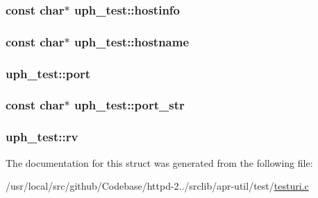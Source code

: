 \subsubsection[{\texorpdfstring{hostinfo}{hostinfo}}]{\setlength{\rightskip}{0pt plus 5cm}const char$\ast$ uph\+\_\+test\+::hostinfo}\hypertarget{structuph__test_ad9ed1e156d8a96df2b48b13f63d42803}{}\label{structuph__test_ad9ed1e156d8a96df2b48b13f63d42803}
\subsubsection[{\texorpdfstring{hostname}{hostname}}]{\setlength{\rightskip}{0pt plus 5cm}const char$\ast$ uph\+\_\+test\+::hostname}\hypertarget{structuph__test_ae9be3a087878b54c338515406ebbe30f}{}\label{structuph__test_ae9be3a087878b54c338515406ebbe30f}
\subsubsection[{\texorpdfstring{port}{port}}]{ uph\+\_\+test\+::port}\hypertarget{structuph__test_abeb24b11057a23a56ad22748e1001270}{}\label{structuph__test_abeb24b11057a23a56ad22748e1001270}
\subsubsection[{\texorpdfstring{port\+\_\+str}{port_str}}]{\setlength{\rightskip}{0pt plus 5cm}const char$\ast$ uph\+\_\+test\+::port\+\_\+str}\hypertarget{structuph__test_a5ef648564afee80e2fd28b0ef178d361}{}\label{structuph__test_a5ef648564afee80e2fd28b0ef178d361}
\subsubsection[{\texorpdfstring{rv}{rv}}]{ uph\+\_\+test\+::rv}\hypertarget{structuph__test_adcc99b1a1f03c9d87ebb16de65ce4b5f}{}\label{structuph__test_adcc99b1a1f03c9d87ebb16de65ce4b5f}


The documentation for this struct was generated from the following file\+:\begin{DoxyCompactItemize}
\item 
/usr/local/src/github/\+Codebase/httpd-\/2../srclib/apr-\/util/test/\hyperlink{testuri_8c}{testuri.\+c}\end{DoxyCompactItemize}
